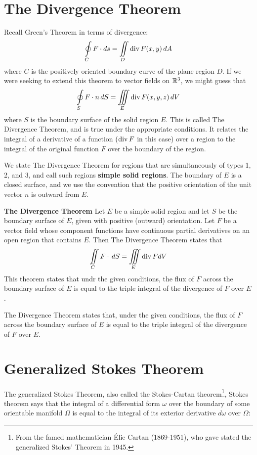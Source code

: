 \section{The Divergence Theorem}

Recall Green's Theorem in terms of divergence: $$\oint\limits_C F \cdot ds = \iint\limits_D \operatorname{div}{F(x,y)} \, dA$$ where $C$ is the positively oriented boundary curve of the plane region $D$. If we were seeking to extend this theorem to vector fields on $\mathbb{R}^3$, we might guess that $$\oint\limits_S F \cdot n \, dS = \iiint\limits_E \operatorname{div}{F(x,y,z)} \, dV$$ where $S$ is the boundary surface of the solid region $E$. This is called The Divergence Theorem, and is true under the appropriate conditions. It relates the integral of a derivative of a function ($\operatorname{div} F$ in this case) over a region to the integral of the original function $F$ over the boundary of the region.

We state The Divergence Theorem for regions that are simultaneously of types 1, 2, and 3, and call such regions \textbf{simple solid regions}. The boundary of $E$ is a closed surface, and we use the convention that the positive orientation of the unit vector $n$ is outward from $E$.

\textbf{The Divergence Theorem} Let $E$ be a simple solid region and let $S$ be the boundary surface of $E$, given with positive (outward) orientation. Let $F$ be a vector field whose component functions have continuous partial derivatives on an open region that contains $E$. Then The Divergence Theorem states that $$\iint\limits_C F \cdot \, dS = \iiint\limits_E \operatorname{div}{F} dV $$ This theorem states that undr the given conditions, the flux of $F$ across the boundary surface of $E$ is equal to the triple integral of the divergence of $F$ over $E$.

The Divergence Theorem states that, under the given conditions, the flux of $F$ across the boundary surface of $E$ is equal to the triple integral of the divergence of $F$ over $E$.

\section{Generalized Stokes Theorem}

The generalized Stokes Theorem, also called the Stokes-Cartan theorem\footnote{From the famed mathematician Élie Cartan (1869-1951), who gave stated the generalized Stokes' Theorem in 1945.}, Stokes theorem says that the integral of a differential form $\omega$ over the boundary of some orientable manifold $\Omega$ is equal to the integral of its exterior derivative $d\omega$ over $\Omega$:


